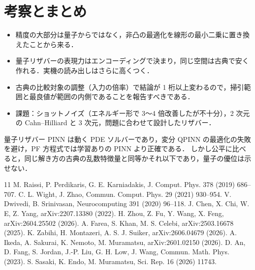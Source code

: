 \documentclass[uplatex,dvipdfmx,a4paper,10pt,twocolumn]{jsarticle}
\theoremstyle{definition}
\begin{document}
\section{考察とまとめ}
\begin{itemize}
  \item 精度の大部分は量子からではなく，非凸の最適化を線形の最小二乗に置き換えたことから来る．
  \item 量子リザバーの表現力はエンコーディングで決まり，同じ空間は古典で安く作れる．実機の読み出しはさらに高くつく．
  \item 古典の比較対象の調整（入力の倍率）で結論が 1 桁以上変わるので，掃引範囲と最良値が範囲の内側であることを報告すべきである．
  \item 課題：ショットノイズ（エネルギー形で 3〜4 倍改善したが不十分），2 次元の Cahn--Hilliard と 3 次元，問題に合わせて設計したリザバー．
\end{itemize}
量子リザバー PINN は動く PDE ソルバーであり，変分 QPINN の最適化の失敗を避け，PF 方程式では学習ありの PINN より正確である．
しかし公平に比べると，同じ解き方の古典の乱数特徴量と同等かそれ以下であり，量子の優位は示せない．

{\footnotesize\setlength{\itemsep}{0pt}\begin{thebibliography}{11}\setlength{\itemsep}{0pt}\setlength{\parskip}{0pt}
 M. Raissi, P. Perdikaris, G. E. Karniadakis, J. Comput. Phys. 378 (2019) 686--707.
 C. L. Wight, J. Zhao, Commun. Comput. Phys. 29 (2021) 930--954.
 V. Dwivedi, B. Srinivasan, Neurocomputing 391 (2020) 96--118.
 J. Chen, X. Chi, W. E, Z. Yang, arXiv:2207.13380 (2022).
 H. Zhou, Z. Fu, Y. Wang, X. Feng, arXiv:2604.25502 (2026).
 A. Farea, S. Khan, M. S. Celebi, arXiv:2503.16678 (2025).
 K. Zabihi, H. Montazeri, A. S. J. Suiker, arXiv:2606.04679 (2026).
 A. Ikeda, A. Sakurai, K. Nemoto, M. Muramatsu, arXiv:2601.02150 (2026).
 D. An, D. Fang, S. Jordan, J.-P. Liu, G. H. Low, J. Wang, Commun. Math. Phys. (2023).
 S. Sasaki, K. Endo, M. Muramatsu, Sci. Rep. 16 (2026) 11743.
\end{thebibliography}}
\end{document}
